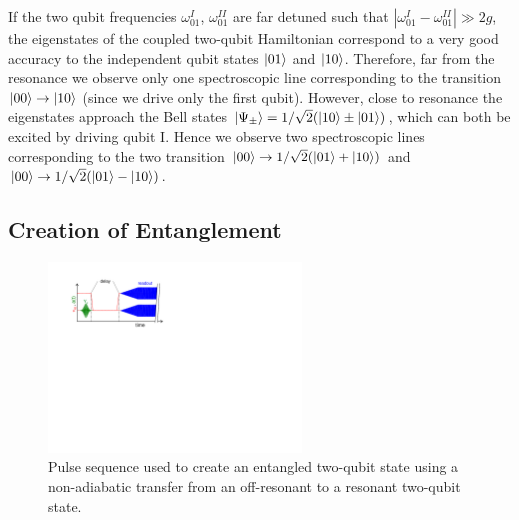If the two qubit frequencies $\omega_{01}^I$, $\omega_{01}^{II}$ are far detuned such that $|\omega_{01}^I-\omega_{01}^{II}|\gg 2g$, the eigenstates of the coupled two-qubit Hamiltonian correspond to a very good accuracy to the independent qubit states $\left| 01 \right>$ and $\left| 10 \right>$. Therefore, far from the resonance we observe only one spectroscopic line corresponding to the transition $\left| 00 \right>\to\left| 10 \right>$ (since we drive only the first qubit). However, close to resonance the eigenstates approach the Bell states $\left| \Psi_\pm \right> = 1/\sqrt{2}(\left| 10 \right>\pm\left| 01 \right>)$, which can both be excited by driving qubit I. Hence we observe two spectroscopic lines corresponding to the two transition $\left| 00 \right>\to 1/\sqrt{2}(\left| 01 \right>+\left| 10 \right>)$ and $\left| 00 \right>\to 1/\sqrt{2}(\left| 01 \right>-\left| 10 \right>)$. 

\subsection{Creation of Entanglement} \label{section:creation_of_entanglement}

\begin{figure}
	\centering
	\includegraphics[width=0.6\textwidth]{"./material/figures/measurement/qubit_swap"}
	\caption[Pulse sequence used to create an entangled two-qubit state]{Pulse sequence used to create an entangled two-qubit state using a non-adiabatic transfer from an off-resonant to a resonant two-qubit state.}
	\label{fig:qubit_swap_pulse_sequence}
\end{figure}

